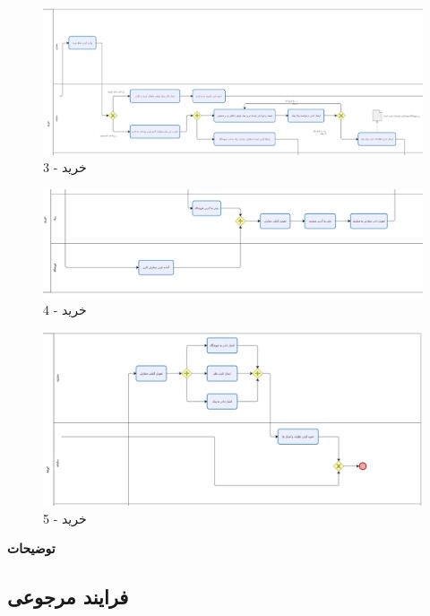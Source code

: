 \documentclass[12pt,a4paper]{article}
\begin{document}
	\begin{figure}[h!]
		\begin{center}
			\includegraphics[width=14cm]{images/Bizagi Buy 3.png}	
		\end{center}
		\caption{خرید - 3}
	\end{figure}
	\begin{figure}[h!]
		\begin{center}
			\includegraphics[width=14cm]{images/Bizagi Buy 4.png}	
		\end{center}
		\caption{خرید - 4}
	\end{figure}
	\pagebreak
	\begin{figure}[h!]
		\begin{center}
			\includegraphics[width=14cm]{images/Bizagi Buy 5.png}	
		\end{center}
		\caption{خرید - 5}
	\end{figure}
	
	\textbf{توضیحات}
	
	
	\pagebreak
\subsection{فرایند مرجوعی} \label{section.function.return}
\end{document}
